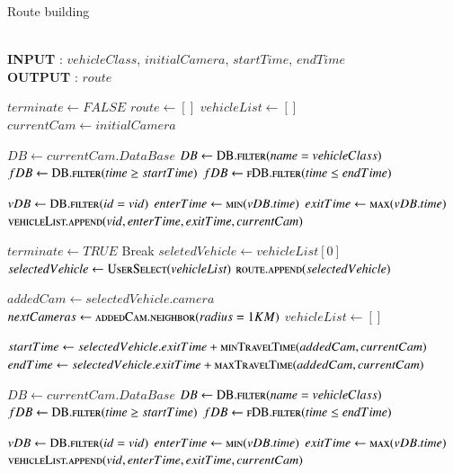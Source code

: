 \begin{breakablealgorithm}
	\caption{Route building}
	~~ \\\textbf{INPUT} : $vehicleClass$, $initialCamera$, $startTime$, $endTime$
	\\ \textbf{OUTPUT} : $route$
	\begin{algorithmic}[1]	
		\State $terminate \gets FALSE$
		\State $route \gets []$
		\State $vehicleList \gets []$
		\State $currentCam \gets initialCamera$
		
		\State $DB \gets currentCam.DataBase$  
		\State $DB \gets \Call{DB.filter}{name=vehicleClass}$
		\State $fDB \gets \Call{DB.filter}{time \geq startTime}$
		\State $fDB \gets \Call{fDB.filter}{time \leq endTime}$
		
			\State $vDB \gets \Call{DB.filter}{id = vid}$
			\State $enterTime \gets \Call{min}{vDB.time}$
			\State $exitTime \gets \Call{max}{vDB.time}$
			\State $\Call{vehicleList.append}{vid,enterTime,exitTime,currentCam}$
		\EndFor
		
			
				\State $terminate \gets TRUE$
				\State Break
				\State $seletedVehicle \gets vehicleList[0]$
			\Else
				\State $selectedVehicle \gets \Call{UserSelect}{vehicleList}$
			\EndIf
			\State $\Call{route.append}{selectedVehicle}$ 
			
			\State $addedCam \gets selectedVehicle.camera$
			\State $nextCameras \gets \Call{addedCam.neighbor}{radius=1KM}$
			\State $vehicleList \gets []$
			

				\State $startTime \gets selectedVehicle.exitTime + \Call{minTravelTime}{addedCam,currentCam}$
				\State $endTime \gets selectedVehicle.exitTime + \Call{maxTravelTime}{addedCam,currentCam}$
							
				\State $DB \gets currentCam.DataBase$  
				\State $DB \gets \Call{DB.filter}{name=vehicleClass}$
				\State $fDB \gets \Call{DB.filter}{time \geq startTime}$
				\State $fDB \gets \Call{fDB.filter}{time \leq endTime}$
				
					\State $vDB \gets \Call{DB.filter}{id = vid}$
					\State $enterTime \gets \Call{min}{vDB.time}$
					\State $exitTime \gets \Call{max}{vDB.time}$
					\State $\Call{vehicleList.append}{vid,enterTime,exitTime,currentCam}$
				\EndFor	
			\EndFor
		\EndWhile
		\State {} 
	\end{algorithmic}
\end{breakablealgorithm}